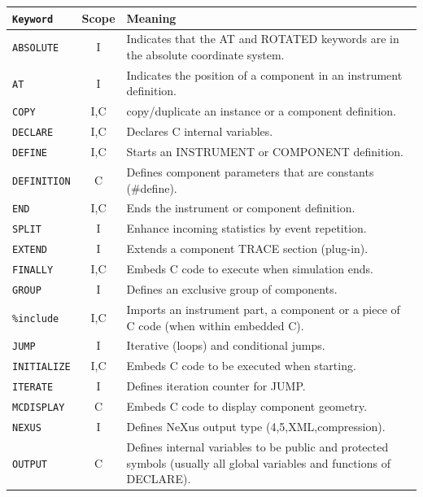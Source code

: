 \begin{table}
  \begin{center}
    {\let\my=\\
    \begin{tabular}{|l|c|p{}|}
      \hline
      \texttt{Keyword} & Scope & Meaning \\
      \hline
      \texttt{ABSOLUTE} & I & Indicates that the AT and ROTATED keywords are in the absolute coordinate system. \\
      \texttt{AT} & I & Indicates the position of a component in an instrument definition. \\
      \texttt{COPY}& I,C & copy/duplicate an instance or a component definition. \\
      \texttt{DECLARE} & I,C & Declares C internal variables. \\
      \texttt{DEFINE} & I,C & Starts an INSTRUMENT or COMPONENT definition. \\
      \texttt{DEFINITION} & C & Defines component parameters that are constants (\#define). \\
      \texttt{END} & I,C & Ends the instrument or component definition. \\
      \texttt{SPLIT} & I & Enhance incoming statistics by event repetition. \\
      \texttt{EXTEND} & I & Extends a component TRACE section (plug-in). \\
      \texttt{FINALLY} & I,C & Embeds C code to execute when simulation ends. \\
      \texttt{GROUP} & I & Defines an exclusive group of components. \\
      \texttt{\%include} & I,C & Imports an instrument part, a component or a piece of C code (when within embedded C). \\
      \texttt{JUMP} & I & Iterative (loops) and conditional jumps. \\
      \texttt{INITIALIZE} & I,C & Embeds C code to be executed when starting. \\
      \texttt{ITERATE} & I & Defines iteration counter for JUMP. \\
      \texttt{MCDISPLAY} & C & Embeds C code to display component geometry. \\
      \texttt{NEXUS} & I & Defines NeXus output type (4,5,XML,compression). \\
      \texttt{OUTPUT} & C & Defines internal variables to be public and protected symbols (usually all global variables and functions of DECLARE).\\

\end{tabular}}
\end{center}
\end{table}

